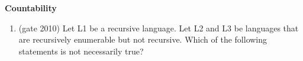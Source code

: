 
\centerline{\textbf{ \LARGE  Countability }}

\begin{enumerate}
    \item (gate 2010) Let L1 be a recursive language. Let L2 and L3 be languages that are recursively enumerable but not recursive. Which of the following statements is not necessarily true?
\end{enumerate}
